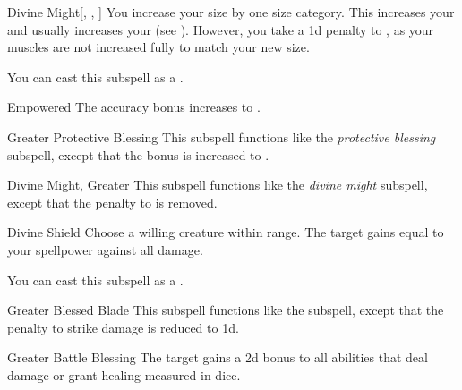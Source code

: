 \begin{ability}[\nth{3}]{Divine Might}[, , ]
You increase your size by one size category.
This increases your  and usually increases your  (see ).
However, you take a \minus1d penalty to , as your muscles are not increased fully to match your new size.

You can cast this subspell as a .
\end{ability}
\vspace{0.25em}


\begin{ability}[\nth{5}]{Empowered}
The accuracy bonus increases to .
\end{ability}
\vspace{0.25em}


\begin{ability}[\nth{5}]{Greater Protective Blessing}
This subspell functions like the \textit{protective blessing} subspell, except that the bonus is increased to .
\end{ability}
\vspace{0.25em}


\begin{ability}[\nth{6}]{Divine Might, Greater}
This subspell functions like the \textit{divine might} subspell, except that the penalty to  is removed.
\end{ability}
\vspace{0.25em}


\begin{ability}[\nth{6}]{Divine Shield}
Choose a willing creature within \rngclose range.
The target gains  equal to your spellpower against all damage.

You can cast this subspell as a .
\end{ability}
\vspace{0.25em}


\begin{ability}[\nth{6}]{Greater Blessed Blade}
This subspell functions like the  subspell, except that the penalty to strike damage is reduced to \minus1d.
\end{ability}
\vspace{0.25em}


\begin{ability}[\nth{7}]{Greater Battle Blessing}
The target gains a \plus2d bonus to all abilities that deal damage or grant healing measured in dice.
\end{ability}
\vspace{0.25em}


